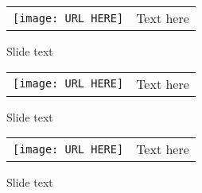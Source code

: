 \documentclass{beamer}
\begin{document}
{
\begin{frame}[Templatename]
\color{green} 
\fontsize{10}{0} \selectfont 
\begin{center}
\begin{tabular}{ c c }
\texttt{[image: URL HERE]} & Text here \\
\end{tabular}
\end{center}

Slide text
\end{frame}
}
{
\begin{frame}[Templatename]
\color{green} 
\fontsize{10}{0} \selectfont 
\begin{center}
\begin{tabular}{ c c }
\texttt{[image: URL HERE]} & Text here \\
\end{tabular}
\end{center}

Slide text
\end{frame}
}
{
\begin{frame}[Templatename]
\color{green} 
\fontsize{10}{0} \selectfont 
\begin{center}
\begin{tabular}{ c c }
\texttt{[image: URL HERE]} & Text here \\
\end{tabular}
\end{center}

Slide text
\end{frame}
}
\end{document}
